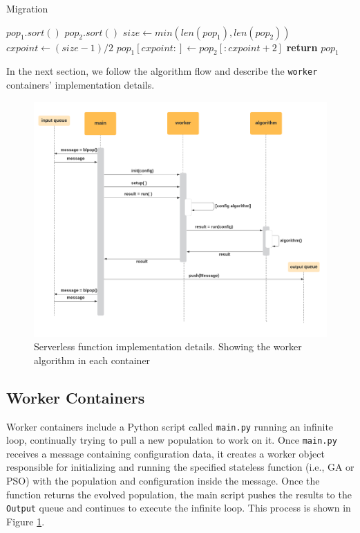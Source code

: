 \documentclass[review]{elsarticle}
\begin{document}
\begin{algorithm}
    \caption{Migration}
    \label{alg:migration}
    \begin{algorithmic}[1]
            \State $pop_1.sort()$
            \State $pop_2.sort()$
            \State $size\gets min(len(pop_1), len(pop_2))$
            \State $cxpoint\gets (size-1)/2$
            \State $pop_1[cxpoint:]\gets pop_2[:cxpoint+2]$
            \State \textbf{return} $pop_1$
        \EndProcedure 
    \end{algorithmic}
\end{algorithm}


In the next section, we follow the algorithm flow and describe the 
\texttt{worker} containers' implementation details. 

\begin{figure}[ht]
    \centering
    \includegraphics[width=\textwidth]{worker_new}
    \caption{Serverless function implementation details. Showing the worker algorithm in each container}
    \label{fig:worker}
\end{figure}



\subsection{Worker Containers} 
\label{workers}

Worker containers include a Python script called \texttt{main.py} running an
infinite loop, continually trying to pull a new population to work on it. Once
\texttt{main.py} receives a message containing configuration data, it creates a
worker object responsible for initializing and running the specified stateless
function (i.e., GA or PSO) with the population and configuration inside the message.
Once the function returns the evolved population,
the main script pushes the results to the \texttt{Output} queue and continues
to execute the infinite loop. This process is shown in Figure \ref{fig:worker}.
\end{document}
